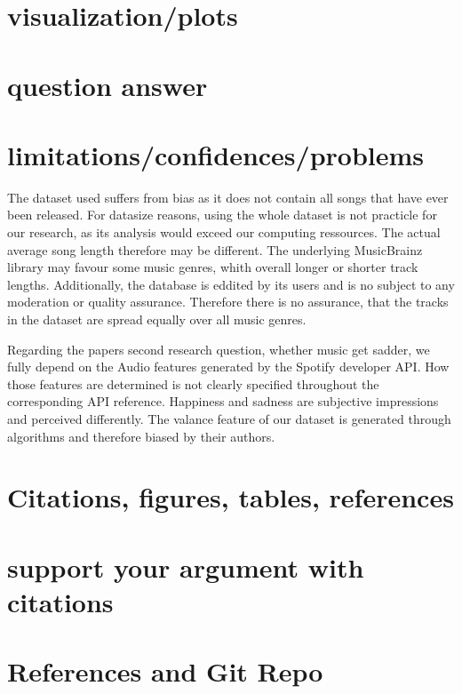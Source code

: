 \documentclass{article}
\begin{document}
\section{visualization/plots}

\section{question answer}


\section{limitations/confidences/problems}
The dataset used suffers from bias as it does not contain all songs that have ever been released. For datasize reasons, using the whole dataset is not practicle for our research, as its analysis would exceed our computing ressources. The actual average song length therefore may be different. The underlying MusicBrainz library may favour some music genres, whith overall longer or shorter track lengths. Additionally, the database is eddited by its users and is no subject to any moderation or quality assurance. Therefore there is no assurance, that the tracks in the dataset are spread equally over all music genres. 

Regarding the papers second research question, whether music get sadder, we fully depend on the Audio features generated by the Spotify developer API. How those features are determined is not clearly specified throughout the corresponding API reference. Happiness and sadness are subjective impressions and perceived differently. The valance feature of our dataset is generated through algorithms and therefore biased by their authors. 
\section{Citations, figures, tables, references}

\section{support your argument with citations}

\section*{References and Git Repo}
\end{document}
